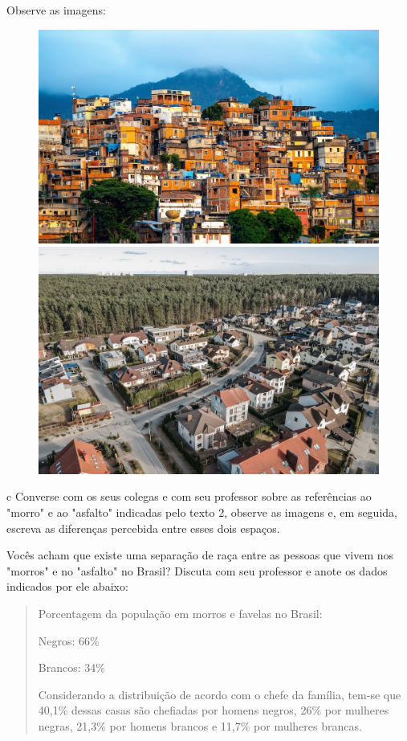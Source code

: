 Observe as imagens:

\begin{figure}[htpb!]
\includegraphics[width=.5\textwidth]{./imgs/img41.png}
\includegraphics[width=.5\textwidth]{./imgs/img42.png}
\end{figure}


\num{c} Converse com os seus colegas e com seu professor sobre as referências ao
"morro" e ao "asfalto" indicadas pelo texto 2, observe as imagens e, em
seguida, escreva as diferenças percebida entre esses dois espaços.


Vocês acham que existe uma separação de raça entre as pessoas que vivem
nos "morros" e no "asfalto" no Brasil? Discuta com seu professor e anote
os dados indicados por ele abaixo:

\begin{quote}
Porcentagem da população em morros e favelas no Brasil:

Negros: 66\%

Brancos: 34\%

Considerando a distribuição de acordo com o chefe da família, tem-se que
40,1\% dessas casas são chefiadas por homens negros, 26\% por mulheres
negras, 21,3\% por homens brancos e 11,7\% por mulheres brancas.
\end{quote}

